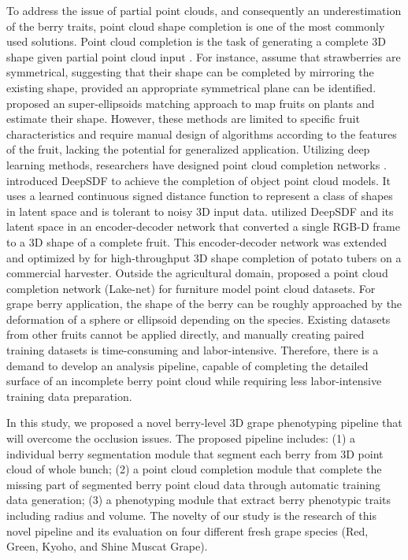 \documentclass[12pt]{article}
\begin{document}
To address the issue of partial point clouds, and consequently an underestimation of the berry traits, point cloud shape completion is one of the most commonly used solutions.
Point cloud completion is the task of generating a complete 3D shape given partial point cloud input \citep{tesema_point_2024}. 
For instance, \citet{ge_symmetrybased_2020} assume that strawberries are symmetrical, suggesting that their shape can be completed by mirroring the existing shape, provided an appropriate symmetrical plane can be identified.
\citet{marangoz_fruit_2022} proposed an super-ellipsoids matching approach to map fruits on plants and estimate their shape.
However, these methods are limited to specific fruit characteristics and require manual design of algorithms according to the features of the fruit, lacking the potential for generalized application.
Utilizing deep learning methods, researchers have designed point cloud completion networks \citep{wang_unsupervised_2021}. 
\citet{park_deepsdf_2019} introduced DeepSDF to achieve the completion of object point cloud models. It uses a learned continuous signed distance function to represent a class of shapes in latent space and is tolerant to noisy 3D input data. 
\citet{magistri_contrastive_2022} utilized DeepSDF and its latent space in an encoder-decoder network that converted a single RGB-D frame to a 3D shape of a complete fruit. 
This encoder-decoder network was extended and optimized by \citet{blok_highthroughput_2025} for high-throughput 3D shape completion of potato tubers on a commercial harvester. Outside the agricultural domain, \citet{tang_lakenet_2022} proposed a point cloud completion network (Lake-net) for furniture model point cloud datasets. 
For grape berry application, the shape of the berry can be roughly approached by the deformation of a sphere or ellipsoid depending on the species. 
Existing datasets from other fruits cannot be applied directly, and manually creating paired training datasets is time-consuming and labor-intensive.
Therefore, there is a demand to develop an analysis pipeline, capable of completing the detailed surface of an incomplete berry point cloud while requiring less labor-intensive training data preparation.

In this study, we proposed a novel berry-level 3D grape phenotyping pipeline that will overcome the occlusion issues. 
The proposed pipeline includes: 
(1) a individual berry segmentation module that segment each berry from 3D point cloud of whole bunch; 
(2) a point cloud completion module that complete the missing part of segmented berry point cloud data through automatic training data generation; 
(3) a phenotyping module that extract berry phenotypic traits including radius and volume. 
The novelty of our study is the research of this novel pipeline and its evaluation on four different fresh grape species (Red, Green, Kyoho, and Shine Muscat Grape).
\end{document}
